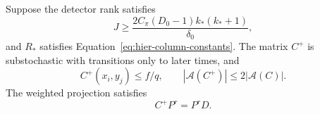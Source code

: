 \begin{proposition}
\label{prop:hier-copy-step}
Suppose the detector rank satisfies
\begin{equation}
 J\geq\frac{2C_\pi(D_0-1)k_*(k_*+1)}{\delta_0},
 \label{eq:hier-active-J}
\end{equation}
and $R_*$ satisfies Equation~\eqref{eq:hier-column-constants}.
The matrix $C^+$ is substochastic with transitions only to later times, and
\[
 C^+(x_i,y_j)\leq f/q,
 \qquad |\mathcal A(C^+)|\leq2|\mathcal A(C)|.
\]
The weighted projection satisfies
\begin{equation}
 C^+P^r=P^rD.
 \label{eq:hier-one-step-intertwining}
\end{equation}
\end{proposition}

